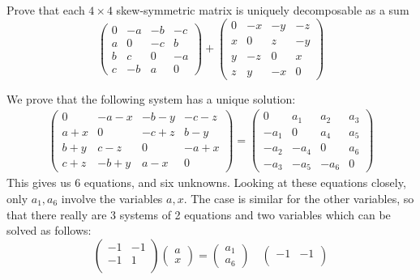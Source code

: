 \documentclass[12pt,onecolumn]{article}
\begin{document}
\begin{exercise}[6.5.4]
 Prove that each $4\times 4$ skew-symmetric matrix is uniquely decomposable as a sum 
 \[
 \begin{pmatrix}
 0 & -a & -b & -c \\
 a & 0 & -c & b \\
 b & c & 0 & -a \\
 c & - b & a & 0
 \end{pmatrix} +
 \begin{pmatrix}
 0 & -x & -y & -z \\
 x & 0 & z & -y \\
 y & -z & 0 & x \\
 z & y & -x & 0 
 \end{pmatrix}
 \]
\end{exercise}
\begin{answer}
We prove that the following system has a unique solution:
\begin{align*}
\begin{pmatrix}
 0 & -a-x & -b-y & -c-z \\
 a+x & 0 & -c+z & b-y \\
 b+y & c-z & 0 & -a+x \\
 c+z & -b+y & a-x & 0
 \end{pmatrix} =
 \begin{pmatrix}
 0 & a_1 & a_2 & a_3 \\
 -a_1 & 0 & a_4 & a_5 \\
 -a_2 & -a_4 & 0 & a_6 \\
 -a_3 & -a_5 & -a_6 & 0
 \end{pmatrix}
\end{align*}
This gives us 6 equations, and six unknowns. Looking at these equations closely, only $a_1,a_6$ involve the variables $a,x$. The case is similar for the other variables, so that there really are 3 systems of 2 equations and two variables which can be solved as follows:
\[
\begin{pmatrix}
-1 & -1 \\
-1 & 1 \\
\end{pmatrix}
\begin{pmatrix}
a \\ x
\end{pmatrix} = 
\begin{pmatrix}
a_1 \\ a_6
\end{pmatrix}
\quad 
\begin{pmatrix}
-1 & -1 \\

\end{pmatrix}\]
\end{answer}
\end{document}
